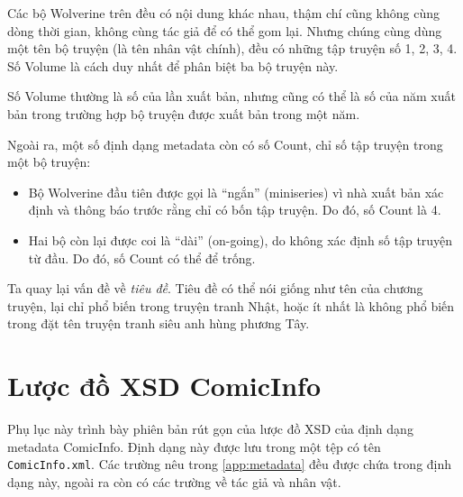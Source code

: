 \documentclass[../../../thesis]{subfiles}
\begin{document}
\begin{appendices}
Các bộ Wolverine trên đều có nội dung khác nhau, thậm chí cũng không cùng dòng
thời gian, không cùng tác giả để có thể gom lại. Nhưng chúng cùng dùng một tên
bộ truyện (là tên nhân vật chính), đều có những tập truyện số 1, 2, 3, 4. Số
Volume là cách duy nhất để phân biệt ba bộ truyện này.

Số Volume thường là số của lần xuất bản, nhưng cũng có thể là số của năm xuất
bản trong trường hợp bộ truyện được xuất bản trong một năm.

Ngoài ra, một số định dạng metadata còn có số Count, chỉ số tập truyện trong một
bộ truyện:

\begin{itemize}
    \item
        Bộ Wolverine đầu tiên được gọi là ``ngắn'' (miniseries) vì nhà xuất bản
        xác định và thông báo trước rằng chỉ có bốn tập truyện. Do đó, số Count
        là 4.
    \item
        Hai bộ còn lại được coi là ``dài'' (on-going), do không xác định số tập
        truyện từ đầu. Do đó, số Count có thể để trống.
\end{itemize}

Ta quay lại vấn đề về \emph{tiêu đề}. Tiêu đề có thể nói giống như tên của
chương truyện, lại chỉ phổ biến trong truyện tranh Nhật, hoặc ít nhất là không
phổ biến trong đặt tên truyện tranh siêu anh hùng phương Tây.



\chapter{Lược đồ XSD ComicInfo}\label{app:comic-info-xsd}

Phụ lục này trình bày phiên bản rút gọn của lược đồ XSD của định dạng metadata
ComicInfo. Định dạng này được lưu trong một tệp có tên \texttt{ComicInfo.xml}.
Các trường nêu trong \autoref{app:metadata} đều được chứa trong định dạng này,
ngoài ra còn có các trường về tác giả và nhân vật.



\end{appendices}
\end{document}
